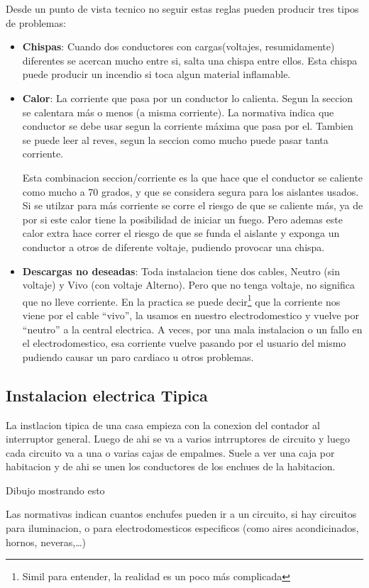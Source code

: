 Desde un punto de vista tecnico no seguir estas reglas pueden producir tres tipos de problemas:
\begin{itemize}
	\item \textbf{Chispas}: Cuando dos conductores con cargas(voltajes, resumidamente) diferentes se acercan mucho entre si, salta una chispa entre ellos. Esta chispa puede producir un incendio si toca algun material inflamable.
	\item \textbf{Calor}: La corriente que pasa por un conductor lo calienta. Segun la seccion se calentara más o menos (a misma corriente). La normativa indica que conductor se debe usar segun la corriente máxima que pasa por el. Tambien se puede leer al reves, segun la seccion como mucho puede pasar tanta corriente. 

Esta combinacion seccion/corriente es la que hace que el conductor se caliente como mucho a 70 grados, y que se considera segura para los aislantes usados. Si se utilzar para más corriente se corre el riesgo de que se caliente más, ya de por si este calor tiene la posibilidad de iniciar un fuego. Pero ademas este calor extra hace correr el riesgo de que se funda el aislante y exponga un conductor a otros de diferente voltaje, pudiendo provocar una chispa.
	\item \textbf{Descargas no deseadas}: Toda instalacion tiene dos cables, Neutro (sin voltaje) y Vivo (con voltaje Alterno). Pero que no tenga voltaje, no significa que no lleve corriente. En la practica se puede decir\footnote{Simil para entender, la realidad es un poco más complicada} que la corriente nos viene por el cable ``vivo'', la usamos en nuestro electrodomestico y vuelve por ``neutro'' a la central electrica. A veces, por una mala instalacion o un fallo en el electrodomestico, esa corriente vuelve pasando por el usuario del mismo pudiendo causar un paro cardiaco u otros problemas.
\end{itemize}
\subsection{Instalacion electrica Tipica}
La instlacion tipica de una casa empieza con la conexion del contador al interruptor general. Luego de ahi se va a varios intrruptores de circuito y luego cada circuito va a una o varias cajas de empalmes. Suele a ver una caja por habitacion y de ahi se unen los conductores de los enchues de la habitacion. 

Dibujo mostrando esto

Las normativas indican cuantos enchufes pueden ir a un circuito, si hay circuitos para iluminacion, o para electrodomesticos especificos (como aires acondicinados, hornos, neveras,\dots)

